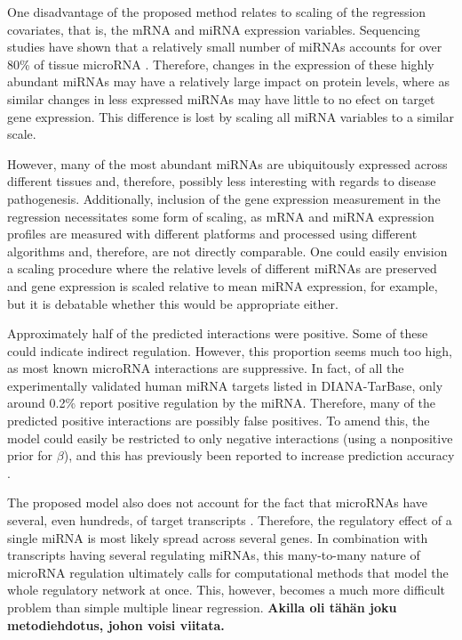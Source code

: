 One disadvantage of the proposed method relates to scaling of the regression
covariates, that is, the mRNA and miRNA expression variables. Sequencing studies have shown
that a relatively small number of miRNAs accounts for over 80\% of tissue microRNA
\citep{Landgraf2007}. Therefore, changes in the expression of these highly
abundant miRNAs may have a relatively large impact on protein levels, where as
similar changes in less expressed miRNAs may have little to no efect on target gene
expression. This difference is lost by scaling all miRNA variables to a similar scale.

However, many of the most abundant miRNAs are ubiquitously expressed across
different tissues \citep{Landgraf2007} and, therefore, possibly less
interesting with regards to disease pathogenesis. Additionally, inclusion of
the gene expression measurement in the regression necessitates some form of
scaling, as mRNA and miRNA expression profiles are measured with different platforms
and processed using different algorithms and, therefore, are not directly
comparable. One could easily envision a scaling procedure where the relative
levels of different miRNAs are preserved and gene expression is scaled
relative to mean miRNA expression, for example, but it is debatable whether
this would be appropriate either.

Approximately half of the predicted interactions were positive. Some of these
could indicate indirect regulation. However, this proportion seems much too
high, as most known microRNA interactions are suppressive. In fact, of all the
experimentally validated human miRNA targets listed in DIANA-TarBase, only
around 0.2\% report positive regulation by the miRNA. Therefore, many of the
predicted positive interactions are possibly false positives. To amend this,
the model could easily be restricted to only negative interactions (using a
nonpositive prior for $\beta$), and this has previously been reported to
increase prediction accuracy \citep{Muniategui2013}.

The proposed model also does not account for the fact that microRNAs have
several, even hundreds, of target transcripts \citep{}. Therefore, the regulatory
effect of a single miRNA is most likely spread across several genes. In
combination with transcripts having several regulating miRNAs, this many-to-many
nature of microRNA regulation ultimately calls for computational methods
that model the whole regulatory network at once. This, however, becomes a much
more difficult problem than simple multiple linear regression. \textbf{Akilla
oli tähän joku metodiehdotus, johon voisi viitata.}


